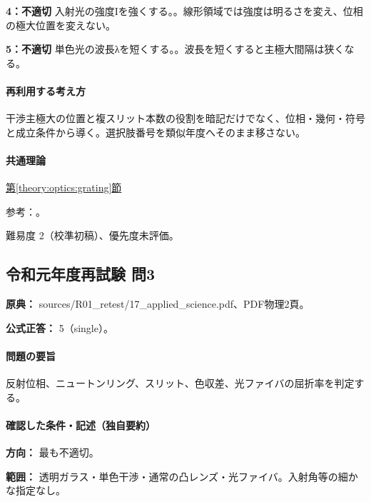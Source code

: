 \noindent\textbf{4：不適切} 入射光の強度Iを強くする。。線形領域では強度は明るさを変え、位相の極大位置を変えない。\par

\noindent\textbf{5：不適切} 単色光の波長λを短くする。。波長を短くすると主極大間隔は狭くなる。\par

\paragraph{再利用する考え方} 干渉主極大の位置と複スリット本数の役割を暗記だけでなく、位相・幾何・符号と成立条件から導く。選択肢番号を類似年度へそのまま移さない。

\paragraph{共通理論} \hyperref[theory:optics:grating]{第\ref*{theory:optics:grating}節}

\par 参考：\cite{os_grating,os_double}。

\par 難易度 2（校準初稿）、優先度未評価。

\subsection{令和元年度再試験 問3}
\label{q:r01-ret-applied-03}

\noindent\textbf{原典：} sources/R01\_retest/17\_applied\_science.pdf、PDF物理2頁。

\textbf{公式正答：} 5（single）。

\paragraph{問題の要旨} 反射位相、ニュートンリング、スリット、色収差、光ファイバの屈折率を判定する。

\paragraph{確認した条件・記述（独自要約）}\mbox{}\par

\noindent\textbf{方向：} 最も不適切。\par

\noindent\textbf{範囲：} 透明ガラス・単色干渉・通常の凸レンズ・光ファイバ。入射角等の細かな指定なし。\par

